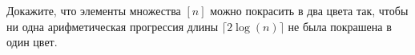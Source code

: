 Докажите, что элементы множества $[n]$ можно покрасить в два цвета так, чтобы ни одна арифметическая
прогрессия длины $\lceil 2 \log(n) \rceil$ не была покрашена в один цвет.
